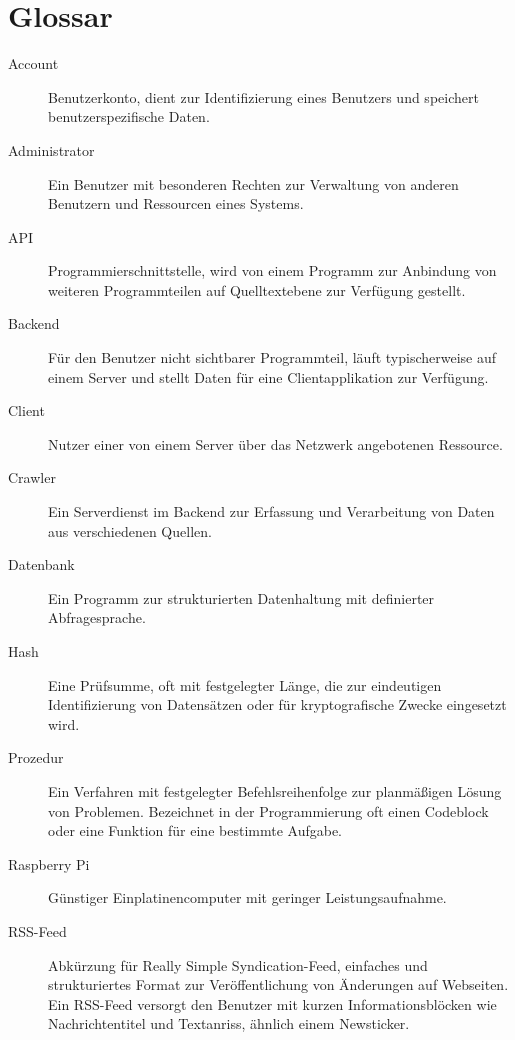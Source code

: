 
\chapter{Glossar}

\begin{description}

\item[Account] Benutzerkonto, dient zur Identifizierung eines Benutzers und
speichert benutzerspezifische Daten.

\item[Administrator] Ein Benutzer mit besonderen Rechten zur Verwaltung von
anderen Benutzern und Ressourcen eines Systems.

\item[API] Programmierschnittstelle, wird von einem Programm zur Anbindung von
weiteren Programmteilen auf Quelltextebene zur Verfügung gestellt. 

\item[Backend] Für den Benutzer nicht sichtbarer Programmteil, läuft
typischerweise auf einem Server und stellt Daten für eine Clientapplikation zur
Verfügung.

\item[Client] Nutzer einer von einem Server über das Netzwerk angebotenen
Ressource.

\item[Crawler] Ein Serverdienst im Backend zur Erfassung und Verarbeitung von
Daten aus verschiedenen Quellen.

\item[Datenbank] Ein Programm zur strukturierten Datenhaltung mit definierter
Abfragesprache.

\item[Hash] Eine Prüfsumme, oft mit festgelegter Länge, die zur
eindeutigen Identifizierung von Datensätzen oder für kryptografische Zwecke
eingesetzt wird.

\item[Prozedur] Ein Verfahren mit festgelegter Befehlsreihenfolge zur
planmäßigen Lösung von Problemen. Bezeichnet in der Programmierung oft einen
Codeblock oder eine Funktion für eine bestimmte Aufgabe.

\item[Raspberry Pi] Günstiger Einplatinencomputer mit geringer
Leistungsaufnahme.

\item[RSS-Feed] Abkürzung für Really Simple Syndication-Feed, einfaches und
strukturiertes Format zur Veröffentlichung von Änderungen auf Webseiten. 
Ein RSS-Feed versorgt den Benutzer mit kurzen Informationsblöcken wie 
Nachrichtentitel und Textanriss, ähnlich einem Newsticker.


\end{description}
